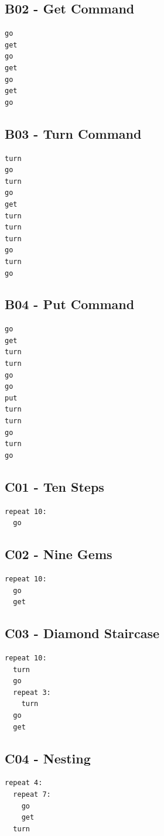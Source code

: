 \documentclass[article,A4,12pt]{llncs}
\begin{document}
\subsection{B02 - Get Command}
\begin{verbatim}
go
get
go
get
go
get 
go
\end{verbatim}



\subsection{B03 - Turn Command}
\begin{verbatim}
turn 
go
turn
go
get
turn
turn
turn
go
turn 
go
\end{verbatim}



\subsection{B04 - Put Command}
\begin{verbatim}
go
get
turn
turn
go
go
put
turn
turn
go
turn 
go
\end{verbatim}


\subsection{C01 - Ten Steps}
\begin{verbatim}
repeat 10:
  go
\end{verbatim}



\subsection{C02 - Nine Gems}
\begin{verbatim}
repeat 10:
  go
  get
\end{verbatim}




\subsection{C03 - Diamond Staircase}
\begin{verbatim}
repeat 10:
  turn
  go
  repeat 3:
    turn
  go 
  get
\end{verbatim}



\subsection{C04 - Nesting}
\begin{verbatim}
repeat 4:
  repeat 7:
    go
    get
  turn
\end{verbatim}
\end{document}
